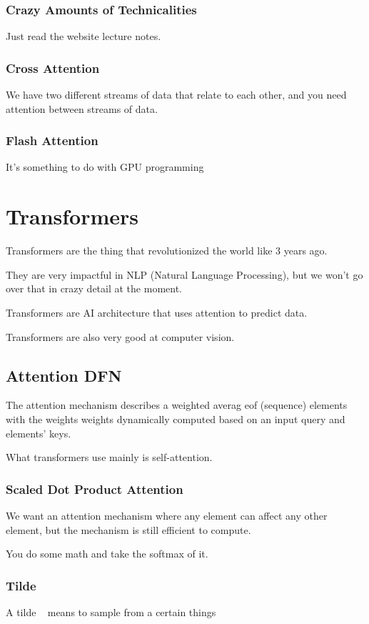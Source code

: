 \documentclass[fleqn]{report}
\begin{document}
\subsection{Crazy Amounts of Technicalities}
Just read the website lecture notes. 

\subsection{Cross Attention}
We have two different streams of data that relate to each other, and you 
need attention between streams of data. 

\subsection{Flash Attention}
It's something to do with GPU programming 

\chapter{Transformers}
Transformers are the thing that revolutionized the world like 3 years ago. 

They are very impactful in NLP (Natural Language Processing), but we won't go 
over that in crazy detail at the moment. 

Transformers are AI architecture that uses attention to predict data. 

Transformers are also very good at computer vision. 

\section{Attention DFN}
The attention mechanism describes a weighted averag eof (sequence) elements with the weights 
weights dynamically computed based on an input query and elements' keys. 

What transformers use mainly is self-attention. 

\subsection{Scaled Dot Product Attention}
We want an attention mechanism where any element can affect any other element, but 
the mechanism is still efficient to compute. 

You do some math and take the softmax of it. 

\subsection{Tilde}
A tilde ~ means to sample from a certain things 
\end{document}

